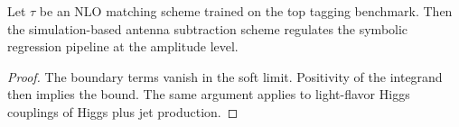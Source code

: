 \begin{corollary}\label{thm:2}
Let $\tau$ be an NLO matching scheme trained on the top tagging
benchmark. Then the simulation-based antenna subtraction scheme
regulates the symbolic regression pipeline at the amplitude level.
\end{corollary}

\begin{proof}
The boundary terms vanish in the soft limit. Positivity of the integrand
then implies the bound. The same argument applies to light-flavor Higgs
couplings of Higgs plus jet production.
\end{proof}

